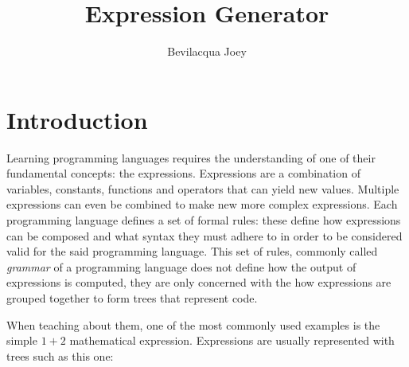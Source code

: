 \documentclass[]{usiinfbachelorproject}
\author{Bevilacqua Joey}
\title{Expression Generator}
\begin{document}
\maketitle
{ \hypersetup{linkcolor=black} \tableofcontents }

\newpage

\section{Introduction}\label{intro}






Learning programming languages requires the understanding of one of their
fundamental concepts: the expressions. Expressions are a combination of
variables, constants, functions and operators that can yield new values.
Multiple expressions can even be combined to make new more complex expressions.
Each programming language defines a set of formal rules: these define how
expressions can be composed and what syntax they must adhere to in order to
be considered valid for the said programming language. This set of rules,
commonly called \textit{grammar} of a programming language does not define how
the output of expressions is computed, they are only concerned with the
how expressions are grouped together to form trees that represent code.

When teaching about them, one of the most commonly used examples is the simple
$ 1 + 2 $ mathematical expression. Expressions are usually represented with
trees such as this one:
\end{document}
